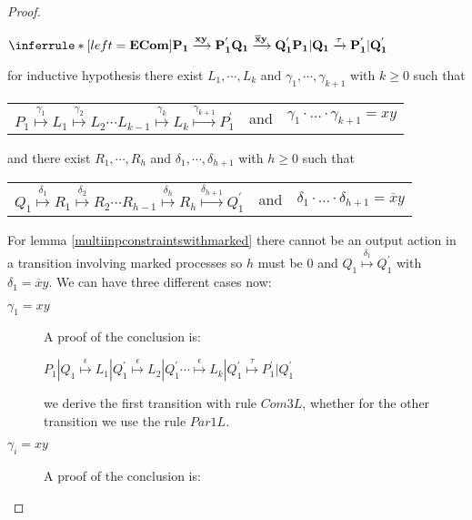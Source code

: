 \begin{proposition}
\begin{proof}
\begin{description}
	\begin{center}
	  $\inferrule* [left=\bf{ECom}]{
	      P_{1} \xrightarrow{xy} P_{1}^{'}
	    \\
	      Q_{1} \xrightarrow{\overline{x}y} Q_{1}^{'}
	  }{
	    P_{1}|Q_{1} \xrightarrow{\tau} P_{1}^{'}|Q_{1}^{'}
	  }$
	\end{center}
	for inductive hypothesis there exist $L_{1}, \cdots, L_{k}$ and $\gamma_{1}, \cdots, \gamma_{k+1}$ with $k\geq 0$ such that 
	\begin{center}
	  \begin{tabular}{lll}
	    $P_{1} \stackrel{\gamma_{1}}{\longmapsto} L_{1}  \stackrel{\gamma_{2}}{\longmapsto} L_{2} \cdots L_{k-1} \stackrel{\gamma_{k}}{\longmapsto} L_{k} \stackrel{\gamma_{k+1}}{\longmapsto} P_{1}^{'}$ 
	  &
	    and
	  &
	    $\gamma_{1} \cdot \ldots \cdot \gamma_{k+1} = xy$
	  \end{tabular}
	\end{center}
	and there exist $R_{1}, \cdots, R_{h}$ and $\delta_{1}, \cdots, \delta_{h+1}$ with $h\geq 0$ such that 
	\begin{center}
	  \begin{tabular}{lll}
	    $Q_{1} \stackrel{\delta_{1}}{\longmapsto} R_{1}  \stackrel{\delta_{2}}{\longmapsto} R_{2} \cdots R_{h-1} \stackrel{\delta_{h}}{\longmapsto} R_{h} \stackrel{\delta_{h+1}}{\longmapsto} Q_{1}^{'}$ 
	  &
	    and
	  &
	    $\delta_{1} \cdot \ldots \cdot \delta_{h+1} = \overline{x}y$
	  \end{tabular}
	\end{center}
	For lemma \ref{multiinpconstraintswithmarked} there cannot be an output action in a transition involving marked processes so $h$ must be $0$ and $Q_{1} \stackrel{\delta_{1}}{\longmapsto} Q_{1}^{'}$ with $\delta_{1}=\overline{x}y$. We can have three different cases now: 
	\begin{description}
	  \item[$\gamma_{1}=xy$]
	    A proof of the conclusion is:
	    \begin{center}
	      $P_{1}|Q_{1} \stackrel{\epsilon}{\longmapsto} L_{1}|Q_{1}^{'}
			      \stackrel{\epsilon}{\longmapsto} L_{2}|Q_{1}^{'}
		  \cdots
				\stackrel{\epsilon}{\longmapsto} L_{k}|Q_{1}^{'}
				\stackrel{\tau}{\longmapsto} P_{1}^{'}|Q_{1}^{'}$	  
	    \end{center}
	    we derive the first transition with rule $Com3L$, whether for the other transition we use the rule $Par1L$.
	  \item[$\gamma_{i}=xy$]
	    A proof of the conclusion is:

\end{description}
\end{description}
\end{proof}
\end{proposition}
